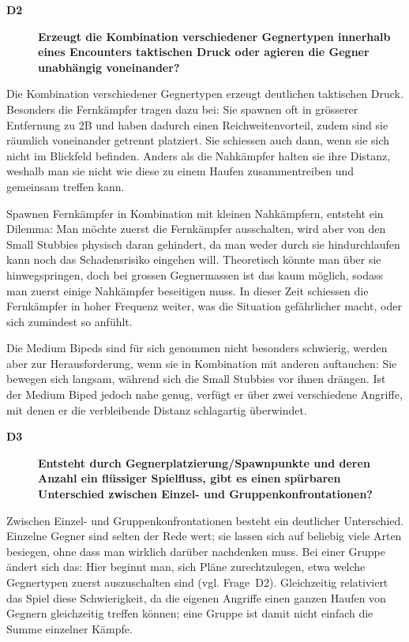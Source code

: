 \documentclass[../Main.tex]{subfiles}
\begin{document}
\begin{description}
    \item[\textbf{D2}] \textbf{Erzeugt die Kombination verschiedener Gegnertypen innerhalb eines Encounters taktischen Druck oder agieren die Gegner unabhängig voneinander?}
\end{description}

Die Kombination verschiedener Gegnertypen erzeugt deutlichen taktischen Druck. Besonders die Fernkämpfer tragen dazu bei: Sie spawnen oft in grösserer Entfernung zu 2B und haben dadurch einen Reichweitenvorteil, zudem sind sie räumlich voneinander getrennt platziert. Sie schiessen auch dann, wenn sie sich nicht im Blickfeld befinden. Anders als die Nahkämpfer halten sie ihre Distanz, weshalb man sie nicht wie diese zu einem Haufen zusammentreiben und gemeinsam treffen kann.

Spawnen Fernkämpfer in Kombination mit kleinen Nahkämpfern, entsteht ein Dilemma: Man möchte zuerst die Fernkämpfer ausschalten, wird aber von den Small Stubbies physisch daran gehindert, da man weder durch sie hindurchlaufen kann noch das Schadensrisiko eingehen will. Theoretisch könnte man über sie hinwegspringen, doch bei grossen Gegnermassen ist das kaum möglich, sodass man zuerst einige Nahkämpfer beseitigen muss. In dieser Zeit schiessen die Fernkämpfer in hoher Frequenz weiter, was die Situation gefährlicher macht, oder sich zumindest so anfühlt.

Die Medium Bipeds sind für sich genommen nicht besonders schwierig, werden aber zur Herausforderung, wenn sie in Kombination mit anderen auftauchen: Sie bewegen sich langsam, während sich die Small Stubbies vor ihnen drängen. Ist der Medium Biped jedoch nahe genug, verfügt er über zwei verschiedene Angriffe, mit denen er die verbleibende Distanz schlagartig überwindet.

\begin{description}
    \item[\textbf{D3}] \textbf{Entsteht durch Gegnerplatzierung/Spawnpunkte und deren Anzahl ein flüssiger Spielfluss, gibt es einen spürbaren Unterschied zwischen Einzel- und Gruppenkonfrontationen?}
\end{description}

Zwischen Einzel- und Gruppenkonfrontationen besteht ein deutlicher Unterschied. Einzelne Gegner sind selten der Rede wert; sie lassen sich auf beliebig viele Arten besiegen, ohne dass man wirklich darüber nachdenken muss. Bei einer Gruppe ändert sich das: Hier beginnt man, sich Pläne zurechtzulegen, etwa welche Gegnertypen zuerst auszuschalten sind (vgl. Frage~D2). Gleichzeitig relativiert das Spiel diese Schwierigkeit, da die eigenen Angriffe einen ganzen Haufen von Gegnern gleichzeitig treffen können; eine Gruppe ist damit nicht einfach die Summe einzelner Kämpfe.
\end{document}
